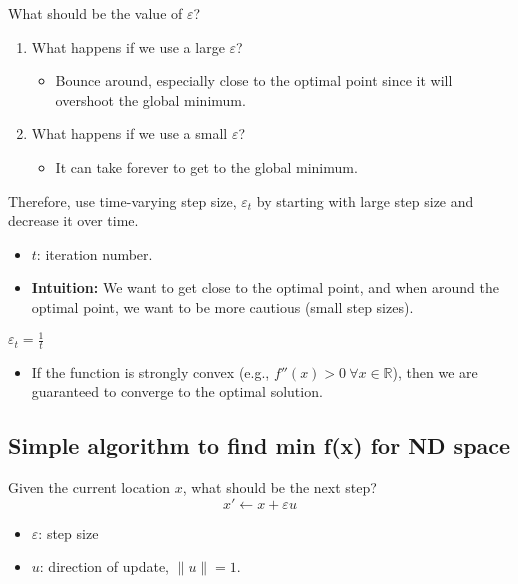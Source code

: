 \begin{intuition}
    What should be the value of \( \varepsilon \)?
        \begin{enumerate}
            \item What happens if we use a large \( \varepsilon \)?
            \begin{itemize}
                \item Bounce around, especially close to the optimal point since it will overshoot the global minimum.
            \end{itemize}
            
            \item What happens if we use a small \( \varepsilon \)?
            \begin{itemize}
                \item It can take forever to get to the global minimum.
            \end{itemize}
        \end{enumerate}  
        \vspace{1em}

    Therefore, use time-varying step size, \( \varepsilon_t \) by starting with large step size and decrease it over time.
    \begin{itemize}
        \item \( t \): iteration number.
        \item \textbf{Intuition:} We want to get close to the optimal point, and when around the optimal point, we want to be more cautious (small step sizes).
    \end{itemize}
\end{intuition}

\begin{example}
    \( \varepsilon_t = \frac{1}{t} \)
    \begin{itemize}
        \item If the function is strongly convex (e.g., \( f''(x) > 0 \ \forall x \in \mathbb{R} \)), then we are guaranteed to converge to the optimal solution.
    \end{itemize}
\end{example}

\subsection{Simple algorithm to find min f(x) for ND space}
\begin{intuition}
    Given the current location \( x \), what should be the next step?
    \[
    x' \leftarrow x + \varepsilon u
    \]
    \begin{itemize}
        \item \( \varepsilon \): step size
        \item \( u \): direction of update, \( \|u\| = 1 \).
    \end{itemize}
\end{intuition}

